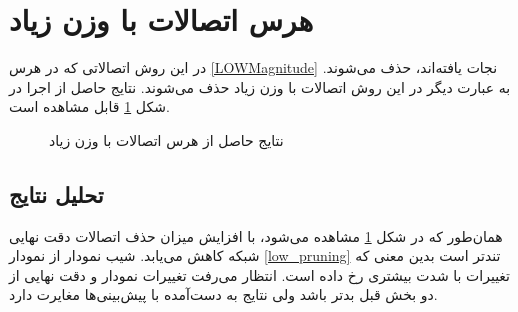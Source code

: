 \section{هرس اتصالات با وزن زیاد}\label{high_mag_pruning}

در این روش اتصالاتی که در هرس 
\ref{LOWMagnitude}
نجات یافته‌اند، حذف می‌شوند. به عبارت دیگر در این روش اتصالات با وزن زیاد حذف می‌شوند. نتایج حاصل از اجرا در شکل
\ref{high-mag}
قابل مشاهده است.

\begin{figure}[H]
	\caption{نتایج حاصل از هرس اتصالات با وزن زیاد}
	\label{high-mag}
\end{figure}
\subsection{تحلیل نتایج}
همان‌طور که در شکل
\ref{high-mag}
مشاهده می‌شود، با افزایش میزان حذف اتصالات دقت نهایی شبکه کاهش می‌یابد. شیب نمودار از نمودار
\ref{low_pruning}
تندتر است بدین معنی که تغییرات با شدت بیشتری رخ داده است. انتظار می‌رفت تغییرات نمودار و دقت نهایی از دو بخش قبل بدتر باشد ولی نتایج به دست‌آمده با پیش‌بینی‌ها مغایرت دارد.
\newpage
